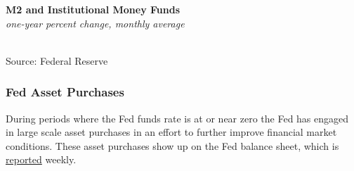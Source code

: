 \documentclass{report}
\makeatletter
\newcommand{\tbllink}[1]{\href{https://raw.githubusercontent.com/bdecon/US-chartbook/master/chartbook/data/#1}{\faTable}}
\newcommand*\short[1]{\expandafter\@gobbletwo\number\numexpr#1\relax}
\newcommand{\dateaxisticks}{
		date coordinates in=x, axis line style={draw=none},
		xmax={2020-05-10},
		max space between ticks=40,	    
		xtick={{1990-01-01}, {1992-01-01}, {1994-01-01}, 
			{1996-01-01}, {1998-01-01}, {2000-01-01}, 
			{2002-01-01}, {2004-01-01}, {2006-01-01},
			{2008-01-01}, {2010-01-01}, {2012-01-01}, {2014-01-01},
		    {2016-01-01}, {2018-01-01}, {2020-01-01}},
		minor xtick={{1989-01-01}, {1991-01-01}, {1993-01-01},
			{1995-01-01}, {1997-01-01}, {1999-01-01}, 
			{2001-01-01}, {2003-01-01}, {2005-01-01}, {2007-01-01},
		    {2009-01-01}, {2011-01-01}, {2013-01-01}, {2015-01-01},
		    {2017-01-01}, {2019-01-01}},
		enlarge y limits={0.06}, enlarge x limits={0.01},
		}
\newcommand{\bbar}[2]{extra #1 ticks = {{#2}}, extra #1 tick labels = ,
		extra #1 tick style = {grid=major, grid style={thick, black!25}},}
\newcommand{\thickline}[4]{\addplot[ultra thick, no markers, color=#1] 
		table [x=#2, y=#3, col sep=comma] {#4};	}
\newcommand{\rbars}{
		\fill[color=black!10] (axis cs:{1990-07-01},\pgfkeysvalueof{/pgfplots/ymin}) rectangle 
			(axis cs:{1991-03-01}, \pgfkeysvalueof{/pgfplots/ymax});
		\fill[color=black!10] (axis cs:{2007-12-01},\pgfkeysvalueof{/pgfplots/ymin}) rectangle 
			(axis cs:{2009-07-01}, \pgfkeysvalueof{/pgfplots/ymax});
		\fill[color=black!10] (axis cs:{2001-03-01},\pgfkeysvalueof{/pgfplots/ymin}) rectangle 
			(axis cs:{2001-11-01}, \pgfkeysvalueof{/pgfplots/ymax});}
\makeatother
\begin{document}
{{{{{{{{{\begin{minipage}{0.76\textwidth}
\vspace{2mm}

\noindent \normalsize \textbf{M2 and Institutional Money Funds}\\
\footnotesize{\textit{one-year percent change, monthly average}}\\ 
\noindent \hspace*{-2mm} \\
\footnotesize{Source: Federal Reserve} \hfill \tbllink{M2imf.csv}

\end{minipage}


\newpage

\subsubsection*{\color{black!70} \seriffont Fed Asset Purchases}

\begin{minipage}{0.76\textwidth}

\small During periods where the Fed funds rate is at or near zero the Fed has engaged in large scale asset purchases in an effort to further improve financial market conditions. These asset purchases show up on the Fed balance sheet, which is \href{https://www.federalreserve.gov/releases/h41/current/default.htm}{reported} weekly. \\



\end{minipage}

\begin{minipage}{0.39\textwidth}

\vspace{2mm}


\end{minipage}}}}}}}}}}
\end{document}
